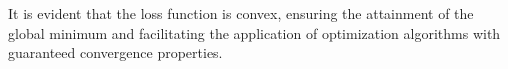 \documentclass[lettersize,journal]{IEEEtran}
\newtheorem{theorem}{Theorem}
\newtheorem{lemma}{Lemma}
\begin{document}
It is evident that the loss function is convex, 
ensuring the attainment of the global minimum 
and facilitating the application of optimization algorithms 
with guaranteed convergence properties.



\end{document}
